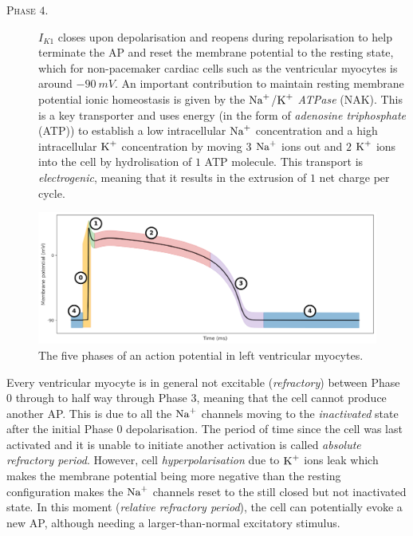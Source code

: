 \begin{description}
	\item[\textsc{Phase $4$.}] $I_{K1}$ closes upon depolarisation and reopens during repolarisation to help terminate the AP and reset the membrane potential to the resting state, which for non-pacemaker cardiac cells such as the ventricular myocytes is around $\SI{-90}{mV}$. An important contribution to maintain resting membrane potential ionic homeostasis is given by the $\textrm{Na}^{+}$/$\textrm{K}^{+}$ \textit{ATPase} (\acs{NAK}). This is a key transporter and uses energy (in the form of \textit{adenosine triphosphate} (\acs{ATP})) to establish a low intracellular $\textrm{Na}^{+}$ concentration and a high intracellular $\textrm{K}^{+}$ concentration by moving $3$ $\textrm{Na}^{+}$ ions out and $2$ $\textrm{K}^{+}$ ions into the cell by hydrolisation of $1$ ATP molecule. This transport is \textit{electrogenic}, meaning that it results in the extrusion of $1$ net charge per cycle.
\end{description}

\begin{figure}[!ht]
    \myfloatalign
    \includegraphics[width=\textwidth]{figures/chapter01/AP_phases.pdf}
    \caption{The five phases of an action potential in left ventricular myocytes.}
    \label{fig:my_label}
\end{figure}

\vspace{0.2cm}
Every ventricular myocyte is in general not excitable (\textit{refractory}) between Phase $0$ through to half way through Phase $3$, meaning that the cell cannot produce another AP. This is due to all the $\textrm{Na}^{+}$ channels moving to the \textit{inactivated} state after the initial Phase $0$ depolarisation. The period of time since the cell was last activated and it is unable to initiate another activation is called \textit{absolute refractory period}. However, cell \textit{hyperpolarisation} due to $\textrm{K}^{+}$ ions leak which makes the membrane potential being more negative than the resting configuration makes the $\textrm{Na}^{+}$ channels reset to the still closed but not inactivated state. In this moment (\textit{relative refractory period}), the cell can potentially evoke a new AP, although needing a larger-than-normal excitatory stimulus.

